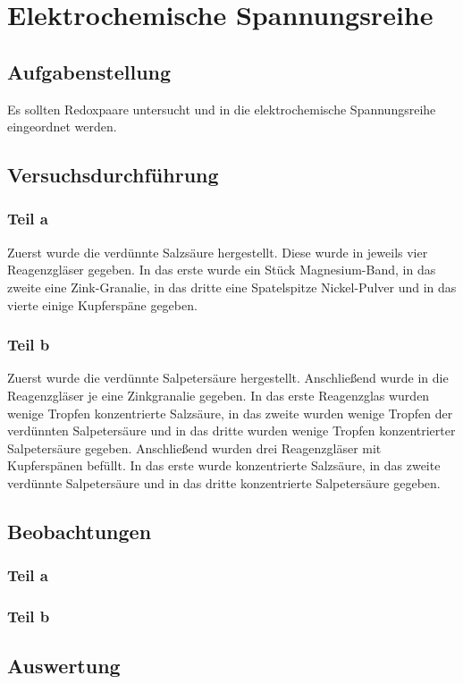 \section{Elektrochemische Spannungsreihe}
\subsection{Aufgabenstellung}
Es sollten Redoxpaare untersucht und in die elektrochemische Spannungsreihe eingeordnet werden.
\subsection{Versuchsdurchführung}
\subsubsection{Teil a}
Zuerst wurde die verdünnte Salzsäure hergestellt. Diese wurde in jeweils vier Reagenzgläser gegeben. In das erste wurde ein Stück Magnesium-Band, in das zweite
eine Zink-Granalie, in das dritte eine Spatelspitze Nickel-Pulver und in das vierte
einige Kupferspäne gegeben.
\subsubsection{Teil b}
Zuerst wurde die verdünnte Salpetersäure hergestellt. Anschließend wurde in die
Reagenzgläser je eine Zinkgranalie gegeben. In das erste Reagenzglas wurden wenige Tropfen konzentrierte Salzsäure, in das zweite wurden wenige Tropfen der
verdünnten Salpetersäure und in das dritte wurden wenige Tropfen konzentrierter
Salpetersäure gegeben. Anschließend wurden drei Reagenzgläser mit Kupferspänen befüllt. In das erste wurde konzentrierte Salzsäure, in das zweite verdünnte
Salpetersäure und in das dritte konzentrierte Salpetersäure gegeben.
\subsection{Beobachtungen}
\subsubsection{Teil a}


\subsubsection{Teil b}

\subsection{Auswertung}
